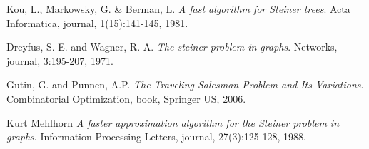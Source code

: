 \documentclass[letterpaper,11pt,twocolumn]{article}
\begin{document}
\begin{thebibliography}{1}

Kou, L., Markowsky, G. & Berman, L. 
\textit{A fast algorithm for Steiner trees}. 
Acta Informatica, journal, 1(15):141-145, 1981.

Dreyfus, S. E. and Wagner, R. A.
\textit{The steiner problem in graphs}. 
Networks, journal, 3:195-207, 1971.

Gutin, G. and Punnen, A.P.
\textit{The Traveling Salesman Problem and Its Variations}. 
Combinatorial Optimization, book, Springer US, 2006.

Kurt Mehlhorn
\textit{A faster approximation algorithm for the Steiner problem in graphs}. 
Information Processing Letters, journal, 27(3):125-128, 1988.

\end{thebibliography}
\end{document}

